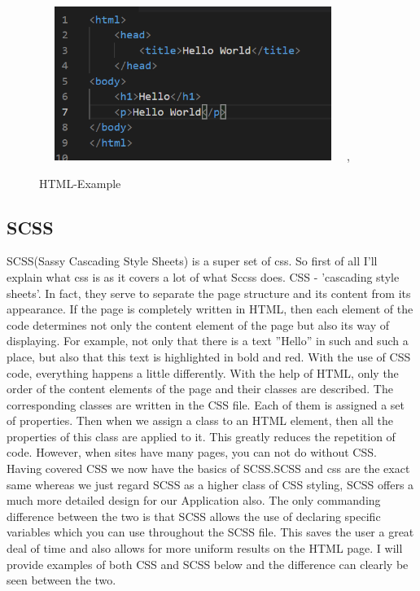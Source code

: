 \documentclass[12pt,a4paper,oneside,openany]{book}
\begin{document}
\begin{figure}[ht]
\renewcommand\thefigure{4.6}
\centering
\includegraphics[width=10cm, height=5cm]{Images/html.png},
\caption{HTML-Example}
\label{html}
\end{figure} 
 
\subsection{SCSS}
SCSS(Sassy Cascading Style Sheets) is a super set of css. So first of all I'll explain what css is as it covers a lot of what Sccss does. CSS - 'cascading style sheets'. 
In fact, they serve to separate the page structure and its content from its appearance. If the page is completely written in HTML, then each element of the code determines not only the content element of the page but also its way of displaying. For example, not only that there is a text ”Hello” in such and such a place, but also that this text is highlighted in bold and red. With the use of CSS code, everything happens a little differently. 
With the help of HTML, only the order of the content elements of the page and their classes are described. The corresponding classes are written in the CSS file. Each of them is assigned a set of properties. Then when we assign a class to an HTML element, then all the properties of this class are applied to it. This greatly reduces the repetition of code. However, when sites have many pages, you can not do without CSS. \cite{css} \\

Having covered CSS we now have the basics of SCSS.SCSS and css are the exact same whereas we just regard SCSS as a higher class of CSS styling, SCSS offers a much more detailed design for our Application also. The only commanding difference between the two is that SCSS allows the use of declaring specific variables which you can use throughout the SCSS file. This saves the user a great deal of time and also allows for more uniform results on the HTML page. I will provide examples of both CSS and SCSS below and the difference can clearly be seen between the two.
\end{document}
